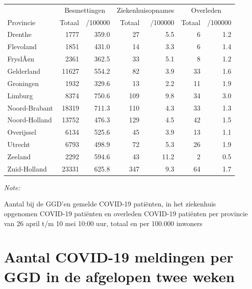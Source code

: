 \documentclass[
  english,
  man,floatsintext]{apa6}
\begin{document}
\begin{table}
\centering
\begin{threeparttable}
\begin{tabular}{lrrrrrr}
\toprule
\multicolumn{1}{c}{ } & \multicolumn{2}{c}{Besmettingen} & \multicolumn{2}{c}{Ziekenhuisopnames} & \multicolumn{2}{c}{Overleden} \\
\cmidrule(l{3pt}r{3pt}){2-3} \cmidrule(l{3pt}r{3pt}){4-5} \cmidrule(l{3pt}r{3pt}){6-7}
Provincie & Totaal & /100000 & Totaal & /100000 & Totaal & /100000\\
\midrule
Drenthe & 1777 & 359.0 & 27 & 5.5 & 6 & 1.2\\
Flevoland & 1851 & 431.0 & 14 & 3.3 & 6 & 1.4\\
FryslÃ¢n & 2361 & 362.5 & 33 & 5.1 & 8 & 1.2\\
Gelderland & 11627 & 554.2 & 82 & 3.9 & 33 & 1.6\\
Groningen & 1932 & 329.6 & 13 & 2.2 & 11 & 1.9\\
Limburg & 8374 & 750.6 & 109 & 9.8 & 34 & 3.0\\
Noord-Brabant & 18319 & 711.3 & 110 & 4.3 & 33 & 1.3\\
Noord-Holland & 13752 & 476.3 & 129 & 4.5 & 42 & 1.5\\
Overijssel & 6134 & 525.6 & 45 & 3.9 & 13 & 1.1\\
Utrecht & 6793 & 498.9 & 72 & 5.3 & 26 & 1.9\\
Zeeland & 2292 & 594.6 & 43 & 11.2 & 2 & 0.5\\
Zuid-Holland & 23331 & 625.8 & 347 & 9.3 & 64 & 1.7\\
\bottomrule
\end{tabular}
\begin{tablenotes}
\item \textit{Note: } 
\item Aantal bij de GGD’en gemelde COVID-19 patiënten, in het ziekenhuis opgenomen COVID-19 patiënten en overleden COVID-19 patiënten per provincie van 26 april t/m 10 mei 10:00 uur, totaal en per 100.000 inwoners
\end{tablenotes}
\end{threeparttable}
\end{table}

\newpage

\hypertarget{aantal-covid-19-meldingen-per-ggd-in-de-afgelopen-twee-weken}{%
\section{Aantal COVID-19 meldingen per GGD in de afgelopen twee weken}\label{aantal-covid-19-meldingen-per-ggd-in-de-afgelopen-twee-weken}}
\end{document}
